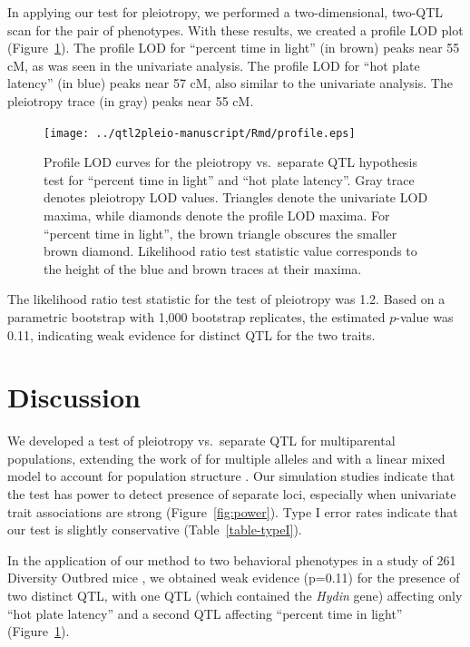 \documentclass[oneside]{book}\usepackage[]{graphicx}\usepackage[]{color}
\begin{document}
In applying our test for pleiotropy,  we performed a two-dimensional, two-QTL scan for the pair of
phenotypes. With these results, we created a profile LOD plot
(Figure~\ref{fig:profiles}). The profile LOD for ``percent
time in light'' (in brown) peaks near 55 cM, as was seen in the univariate
analysis.  The profile LOD for ``hot plate latency'' (in blue) peaks near 57 cM,
also similar to the univariate analysis.
The pleiotropy trace (in gray) peaks near 55 cM.

\begin{figure}
\texttt{[image: ../qtl2pleio-manuscript/Rmd/profile.eps]}
\caption{Profile LOD curves for the pleiotropy vs.\ separate QTL
  hypothesis test for ``percent time in light'' and ``hot plate latency''.
  Gray trace denotes pleiotropy LOD values. Triangles denote the
  univariate LOD maxima, while diamonds denote the profile LOD maxima.
  For ``percent time in light'', the brown triangle obscures the
  smaller brown diamond. Likelihood ratio test statistic value
  corresponds to the height of the blue and brown traces at their
  maxima.}
\label{fig:profiles}
\end{figure}

The likelihood ratio test statistic for the test of pleiotropy was
1.2. Based on a parametric bootstrap with 1,000 bootstrap replicates,
the estimated $p$-value was 0.11, indicating weak
evidence for distinct QTL for the two traits.









\section{Discussion}

We developed a test of pleiotropy vs.\ separate QTL for multiparental
populations, extending the work of \citet{jiang1995multiple} for
multiple alleles and with a linear mixed model to account for
population structure \citep{kang2010variance, yang2014advantages}. Our simulation
studies indicate that the test has power to detect presence of
separate loci, especially when univariate trait associations are
strong (Figure~\ref{fig:power}). Type I error rates indicate that our
test is slightly conservative (Table~\ref{table-typeI}).

In the application of our method to two behavioral phenotypes in a
study of 261 Diversity Outbred mice
\citep{recla2014precise,logan2013high}, we obtained weak evidence
(p=0.11) for the presence of two distinct QTL, with one QTL (which
contained the \textit{Hydin} gene) affecting only ``hot plate latency'' and a
second QTL affecting ``percent time in light'' (Figure~\ref{fig:profiles}).
\end{document}
